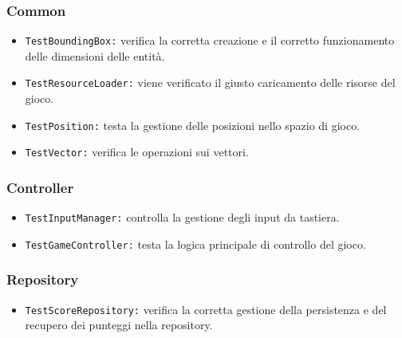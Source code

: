 \documentclass[a4paper,12pt]{report}
\begin{document}
\subsubsection*{Common}
\begin{itemize}
	\item \texttt{TestBoundingBox:} verifica la corretta creazione e il corretto funzionamento delle dimensioni delle entità.
	\item \texttt{TestResourceLoader:} viene verificato il giusto caricamento delle risorse del gioco.
	\item \texttt{TestPosition:} testa la gestione delle posizioni nello spazio di gioco.
	\item \texttt{TestVector:} verifica le operazioni sui vettori.
\end{itemize}

\subsubsection*{Controller}
\begin{itemize}
	\item \texttt{TestInputManager:} controlla la gestione degli input da tastiera.
	\item \texttt{TestGameController:}  testa la logica principale di controllo del gioco.
\end{itemize}

\subsubsection*{Repository}
\begin{itemize}
	\item \texttt{TestScoreRepository:} verifica la corretta gestione della persistenza e del recupero dei punteggi nella repository.
\end{itemize}

\newpage
\end{document}
